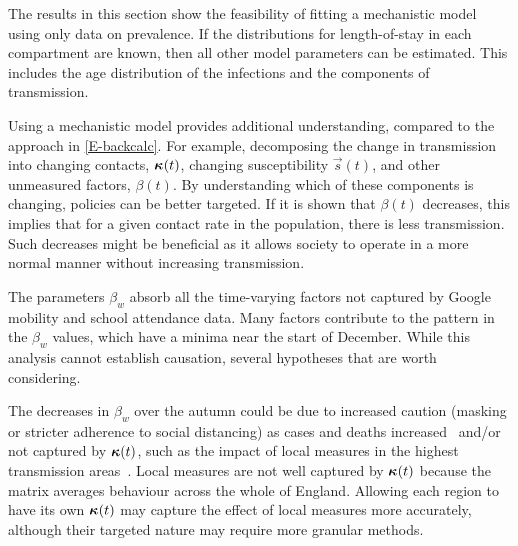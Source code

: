 \documentclass[thesis.tex]{subfiles}
\begin{document}
The results in this section show the feasibility of fitting a mechanistic model using only data on prevalence.
If the distributions for length-of-stay in each compartment are known, then all other model parameters can  be estimated.
This includes the age distribution of the infections and the components of transmission.

Using a mechanistic model provides additional understanding, compared to the approach in \cref{E-backcalc}.
For example, decomposing the change in transmission into changing contacts, $\bm{\kappa}(t)$, changing susceptibility $\vec{s}(t)$, and other unmeasured factors, $\beta(t)$.
By understanding which of these components is changing, policies can be better targeted.
If it is shown that $\beta(t)$ decreases, this implies that for a given contact rate in the population, there is less transmission.
Such decreases might be beneficial as it allows society to operate in a more normal manner without increasing transmission.


The parameters $\beta_w$ absorb all the time-varying factors not captured by Google mobility and school attendance data.
Many factors contribute to the pattern in the $\beta_w$ values, which have a minima near the start of December.
While this analysis cannot establish causation, several hypotheses that are worth considering.

The decreases in $\beta_w$ over the autumn could be due to increased caution (\eg masking or stricter adherence to social distancing) as cases and deaths increased~\autocite{jarvisEffect} and/or not captured by $\bm{\kappa}(t)$, such as the impact of local measures in the highest transmission areas~\autocite{scottCovid19}.
Local measures are not well captured by $\bm{\kappa}(t)$ because the matrix averages behaviour across the whole of England.
Allowing each region to have its own $\bm{\kappa}(t)$ may capture the effect of local measures more accurately, although their targeted nature may require more granular methods.
\end{document}
